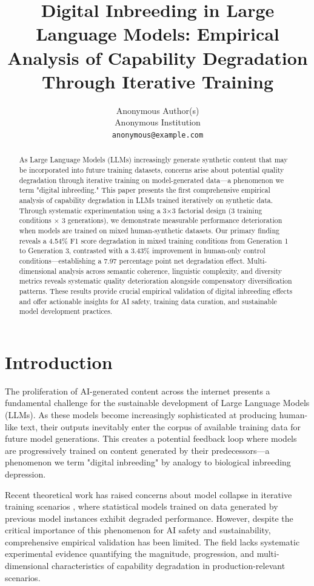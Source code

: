 \documentclass{article}
\title{Digital Inbreeding in Large Language Models: Empirical Analysis of Capability Degradation Through Iterative Training}
\author{%
  Anonymous Author(s)\\
  Anonymous Institution\\
  \texttt{anonymous@example.com}
}
\begin{document}
\maketitle

\begin{abstract}
As Large Language Models (LLMs) increasingly generate synthetic content that may be incorporated into future training datasets, concerns arise about potential quality degradation through iterative training on model-generated data—a phenomenon we term "digital inbreeding." This paper presents the first comprehensive empirical analysis of capability degradation in LLMs trained iteratively on synthetic data. Through systematic experimentation using a 3×3 factorial design (3 training conditions × 3 generations), we demonstrate measurable performance deterioration when models are trained on mixed human-synthetic datasets. Our primary finding reveals a 4.54\% F1 score degradation in mixed training conditions from Generation 1 to Generation 3, contrasted with a 3.43\% improvement in human-only control conditions—establishing a 7.97 percentage point net degradation effect. Multi-dimensional analysis across semantic coherence, linguistic complexity, and diversity metrics reveals systematic quality deterioration alongside compensatory diversification patterns. These results provide crucial empirical validation of digital inbreeding effects and offer actionable insights for AI safety, training data curation, and sustainable model development practices.
\end{abstract}

\section{Introduction}

The proliferation of AI-generated content across the internet presents a fundamental challenge for the sustainable development of Large Language Models (LLMs). As these models become increasingly sophisticated at producing human-like text, their outputs inevitably enter the corpus of available training data for future model generations. This creates a potential feedback loop where models are progressively trained on content generated by their predecessors—a phenomenon we term "digital inbreeding" by analogy to biological inbreeding depression.

Recent theoretical work has raised concerns about model collapse in iterative training scenarios \cite{shumailov2024curse}, where statistical models trained on data generated by previous model instances exhibit degraded performance. However, despite the critical importance of this phenomenon for AI safety and sustainability, comprehensive empirical validation has been limited. The field lacks systematic experimental evidence quantifying the magnitude, progression, and multi-dimensional characteristics of capability degradation in production-relevant scenarios.
\end{document}
